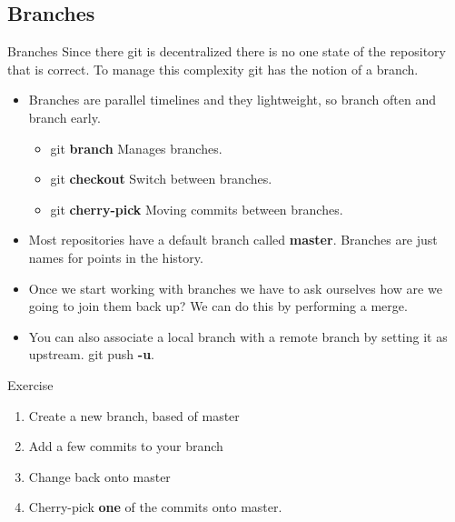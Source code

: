 \documentclass{beamer}
\begin{document}
\subsection{Branches}
\begin{frame}[fragile]{Branches}
  Since there git is decentralized there is no one state of the repository that is correct. To manage this complexity git has the notion of a branch. 
  \begin{itemize}
    \item Branches are parallel timelines and they lightweight, so branch often and branch early.
  \begin{block}{}
    \begin{itemize}
      \item git \textbf{branch}  Manages branches. 
      \item git \textbf{checkout} Switch between branches.
      \item git \textbf{cherry-pick} Moving commits between branches.
    \end{itemize}
  \end{block}
    \item Most repositories have a default branch called \textbf{master}. Branches are just names for points in the history.
    \item Once we start working with branches we have to ask ourselves how are we going to join them back up? We can do this by performing a merge.

    \item You can also associate a local branch with a remote branch by setting it as upstream. git push \textbf{-u}.
  \end{itemize}
\end{frame}
\begin{frame}
  \begin{block}{Exercise}
    \begin{enumerate}
      \item Create a new branch, based of master
      \item Add a few commits to your branch
      \item Change back onto master
      \item Cherry-pick \textbf{one} of the commits onto master.
    \end{enumerate}
  \end{block}
\end{frame}
\end{document}
